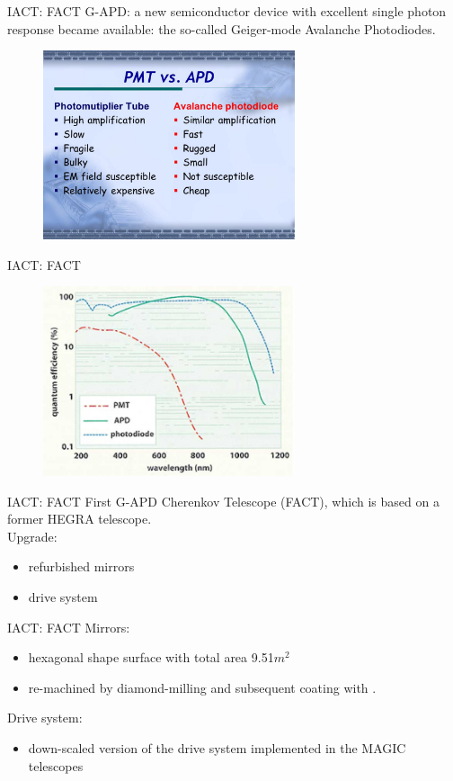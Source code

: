 \documentclass{beamer}
\begin{document}
\begin{frame}{IACT: FACT}
	G-APD: a new semiconductor device with excellent single photon response became available: the so-called Geiger-mode Avalanche Photodiodes.
	\begin{figure}[h]
		\includegraphics[width=280px]{PMTvsAPD.jpg}
	\end{figure}
\end{frame}


\begin{frame}{IACT: FACT}
	\begin{figure}[h]
		\includegraphics[width=280px]{DetectorsGuidepost.jpg}
	\end{figure}
\end{frame}

\begin{frame}{IACT: FACT}
	First G-APD Cherenkov Telescope (FACT), which is based on a former HEGRA telescope.
	\newline
	\\
	Upgrade:
	\begin{itemize}
		\item refurbished mirrors
		\item drive system
	\end{itemize}
\end{frame}


\begin{frame}{IACT: FACT}
	Mirrors:
	\begin{itemize}
		\item hexagonal shape surface with total area 9.51$m^2$
		\item re-machined by diamond-milling and subsequent coating with .
	\end{itemize}
	\hfill \break
	Drive system:
	\begin{itemize}
		\item down-scaled version of the drive system implemented in the MAGIC telescopes
	\end{itemize}
\end{frame}
\end{document}
